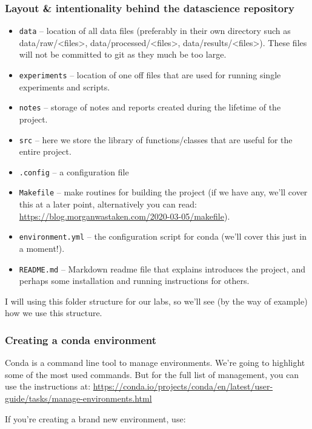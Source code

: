 \documentclass[10pt]{beamer}
\begin{document}
\subsubsection*{Layout \& intentionality behind the datascience repository}
\label{sec:org176639f}
\begin{itemize}
\item \texttt{data} -- location of all data files (preferably in their own directory such as
data/raw/<files>, data/processed/<files>, data/results/<files>). These files will
not be committed to git as they much be too large.
\item \texttt{experiments} -- location of one off files that are used for running single
experiments and scripts.
\item \texttt{notes} -- storage of notes and reports created during the lifetime of the project.
\item \texttt{src} -- here we store the library of functions/classes that are useful for the
entire project.
\item \texttt{.config} -- a configuration file
\item \texttt{Makefile} -- make routines for building the project (if we have any, we'll cover
this at a later point, alternatively you can read:
\url{https://blog.morganwastaken.com/2020-03-05/makefile}).
\item \texttt{environment.yml} -- the configuration script for conda (we'll cover this just in a
moment!).
\item \texttt{README.md} -- Markdown readme file that explains introduces the project, and perhaps
some installation and running instructions for others.
\end{itemize}

I will using this folder structure for our labs, so we'll see (by the way of example)
how we use this structure.

\subsubsection*{Creating a conda environment}
\label{sec:org91b9e38}

Conda is a command line tool to manage environments. We're going to highlight some of the most used commands. But for the full list of management, you can use the instructions at: \url{https://conda.io/projects/conda/en/latest/user-guide/tasks/manage-environments.html}

If you're creating a brand new environment, use:
\end{document}
